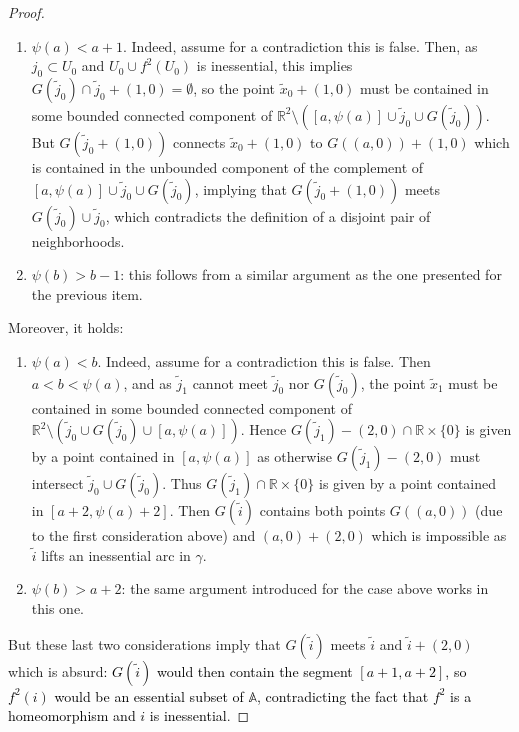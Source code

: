 \documentclass[12pt,a4paper]{amsart}
\theoremstyle{definition}
\theoremstyle{remark}
\newcommand{\R}{\mathbb{R}}
\newcommand{\A}{\mathbb{A}}
\begin{document}
\begin{proof}
\begin{enumerate}
\item $\psi(a)<a+1$. Indeed, assume for a contradiction this is false. Then, as $j_0\subset U_0$ and $U_0 \cup f^2(U_0)$ is inessential, this implies $G(\tilde{j}_0) \cap
\widetilde{j}_0+(1,0)=\emptyset$, so the point $\widetilde{x}_0+(1,0)$ must be contained in some bounded connected component of $\R^2\setminus \left([a,\psi(a)]\cup\widetilde{j}_0\cup G(\widetilde{j}_0)\right)$. But  $G(\widetilde{j}_0+(1,0))$ connects $\widetilde{x}_0+(1,0)$ to $G((a,0))+(1,0)$ which is contained in the unbounded component of the complement of
    $[a,\psi(a)]\cup\widetilde{j}_0\cup G(\widetilde{j}_0)$, implying that $G(\widetilde{j}_0+(1,0))$
    meets $G(\widetilde{j}_0)\cup\widetilde{j}_0$, which contradicts the definition of a disjoint pair of neighborhoods.

\item $\psi(b)>b-1$: this follows from a similar argument as the one presented for the previous item.
\end{enumerate}

Moreover, it holds:

\begin{enumerate}[resume]

\item $\psi(a)<b$. Indeed, assume for a contradiction this is false. Then $a<b<\psi(a)$, and as $\widetilde{j}_1$
cannot meet $\widetilde{j}_0$ nor $G(\widetilde{j}_0)$, the point $\widetilde{x}_1$ must be contained in some
bounded connected component of $\R^2\setminus \left(\widetilde{j}_0\cup G(\widetilde{j}_0)\cup [a,\psi(a)]\right)$. Hence
$G(\widetilde{j}_1)-(2,0)\cap \R\times\{0\}$ is given by a point contained in $[a,\psi(a)]$ as otherwise
$G(\widetilde{j}_1)-(2,0)$ must intersect $\widetilde{j}_0 \cup G(\widetilde{j}_0)$. Thus
$G(\widetilde{j}_1) \cap \R\times\{0\}$ is given by a point contained in $[a+2,\psi(a)+2]$. Then
$G(\widetilde{i})$ contains both points $G((a,0))$ (due to the first consideration above)
and $(a,0)+(2,0)$ which is impossible as $\widetilde{i}$ lifts an inessential arc in $\gamma$.

\item $\psi(b)>a+2$: the same argument introduced for the case above works
in this one.

\end{enumerate}

But these last two considerations imply that $G(\widetilde{i})$ meets $\widetilde{i}$ and $\widetilde{i}+(2,0)$ which is absurd\textcolor{black}{: $G(\tilde{i})$ would then contain the segment $[a+1,a+2]$, so $f^2(i)$ would be an essential subset of $\A$, contradicting the fact that $f^2$ is a homeomorphism and $i$ is inessential}.
\end{proof}
\end{document}
